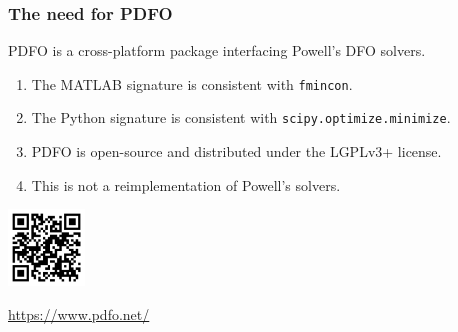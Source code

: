 \documentclass{polyu-presentation}
\begin{document}
\begin{frame}
    \frametitle{The need for PDFO}

    \begin{block}{}
        \alert{PDFO} is a \alert{cross-platform} package interfacing Powell's DFO solvers.
    \end{block}

    \medskip

    \begin{enumerate}
        \item The \alert{MATLAB} signature is consistent with \texttt{fmincon}.
        \item The \alert{Python} signature is consistent with \texttt{scipy.optimize.minimize}.
        \item PDFO is \alert{open-source} and distributed under the LGPLv3+ license.
        \item This is \alert{not} a reimplementation of Powell's solvers.
    \end{enumerate}

    \medskip
    
	\begin{center}
        \href{https://www.pdfo.net/}{\includegraphics[width=0.8in]{images/qr/pdfo.png}}

        \scriptsize\url{https://www.pdfo.net/}
    \end{center}
\end{frame}
\end{document}
